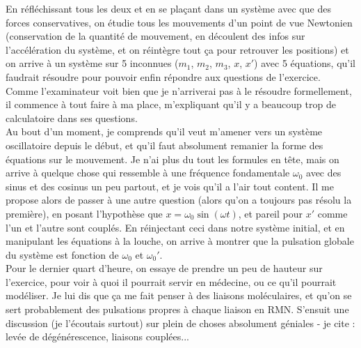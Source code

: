 \begin{center}
\end{center}

En réfléchissant tous les deux et en se plaçant dans un système avec que des forces conservatives, on étudie tous les mouvements d'un point de vue Newtonien (conservation de la quantité de mouvement, en découlent des infos sur l'accélération du système, et on réintègre tout ça pour retrouver les positions) et on arrive à un système sur 5 inconnues ($m_1$, $m_2$, $m_3$, $x$, $x'$) avec 5 équations, qu'il faudrait résoudre pour pouvoir enfin répondre aux questions de l'exercice. Comme l'examinateur voit bien que je n'arriverai pas à le résoudre formellement, il commence à tout faire à ma place, m'expliquant qu'il y a beaucoup trop de calculatoire dans ses questions. \\

Au bout d'un moment, je comprends qu'il veut m'amener vers un système oscillatoire depuis le début, et qu'il faut absolument remanier la forme des équations sur le mouvement. Je n'ai plus du tout les formules en tête, mais on arrive à quelque chose qui ressemble à une fréquence fondamentale $\omega_0$ avec des sinus et des cosinus un peu partout, et je vois qu'il a l'air tout content. Il me propose alors de passer à une autre question (alors qu'on a toujours pas résolu la première), en posant l'hypothèse que $x=\omega_0 \sin(\omega t)$, et pareil pour $x'$ comme l'un et l'autre sont couplés. En réinjectant ceci dans notre système initial, et en manipulant les équations à la louche, on arrive à montrer que la pulsation globale du système est fonction de $\omega_0$ et $\omega_0 '$.\\

Pour le dernier quart d'heure, on essaye de prendre un peu de hauteur sur l'exercice, pour voir à quoi il pourrait servir en médecine, ou ce qu'il pourrait modéliser. Je lui dis que ça me fait penser à des liaisons moléculaires, et qu'on se sert probablement des pulsations propres à chaque liaison en RMN. S'ensuit une discussion (je l'écoutais surtout) sur plein de choses absolument géniales - je cite : levée de dégénérescence, liaisons couplées...\\

